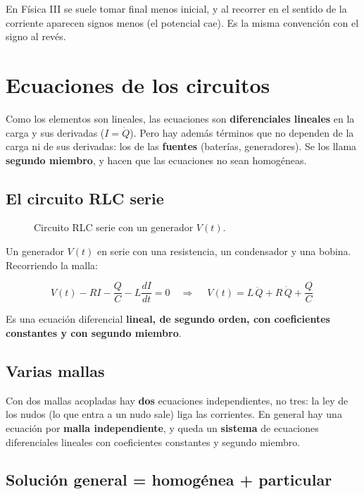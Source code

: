\documentclass[12pt,a4paper]{article}
\begin{document}
\begin{notebox}
En Física III se suele tomar final menos inicial, y al recorrer en el sentido
de la corriente aparecen signos menos (el potencial cae). Es la misma
convención con el signo al revés.
\end{notebox}

\section{Ecuaciones de los circuitos}

Como los elementos son lineales, las ecuaciones son \textbf{diferenciales lineales}
en la carga y sus derivadas ($I = \dot Q$). Pero hay además términos que no
dependen de la carga ni de sus derivadas: los de las \textbf{fuentes} (baterías,
generadores). Se los llama \textbf{segundo miembro}, y hacen que las ecuaciones no
sean homogéneas.

\subsection{El circuito RLC serie}

\begin{figure}[H]
  \centering
  
  \caption{Circuito RLC serie con un generador $V(t)$.}
\end{figure}

Un generador $V(t)$ en serie con una resistencia, un condensador y una bobina.
Recorriendo la malla:

\[
V(t) - R I - \frac{Q}{C} - L\frac{dI}{dt} = 0
\quad\Longrightarrow\quad
\boxed{\ V(t) = L\,\ddot Q + R\,\dot Q + \frac{Q}{C}\ }
\]

Es una ecuación diferencial \textbf{lineal, de segundo orden, con coeficientes
constantes y con segundo miembro}.

\subsection{Varias mallas}

Con dos mallas acopladas hay \textbf{dos} ecuaciones independientes, no tres: la ley
de los nudos (lo que entra a un nudo sale) liga las corrientes. En general hay
una ecuación por \textbf{malla independiente}, y queda un \textbf{sistema} de ecuaciones
diferenciales lineales con coeficientes constantes y segundo miembro.

\subsection{Solución general = homogénea + particular}
\end{document}
